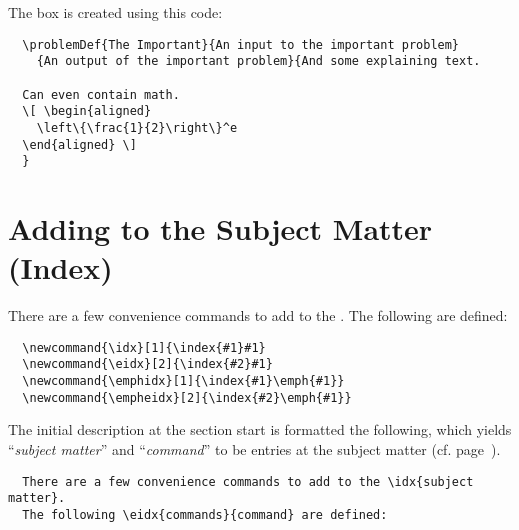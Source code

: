 The box is created using this code:

\begin{lstlisting}
  \problemDef{The Important}{An input to the important problem}
    {An output of the important problem}{And some explaining text.

  Can even contain math.
  \[ \begin{aligned}
    \left\{\frac{1}{2}\right\}^e
  \end{aligned} \]
  }
\end{lstlisting}



\section{Adding to the Subject Matter (Index)}\label{sec:index}

There are a few convenience commands to add to the . The following  are defined:

\begin{lstlisting}
  \newcommand{\idx}[1]{\index{#1}#1}
  \newcommand{\eidx}[2]{\index{#2}#1}
  \newcommand{\emphidx}[1]{\index{#1}\emph{#1}}
  \newcommand{\empheidx}[2]{\index{#2}\emph{#1}}
\end{lstlisting}

The initial description at the section start is formatted the following, which yields ``\emph{subject matter}'' and ``\emph{command}'' to be entries at the subject matter (cf. page~\pageref{lbl:index}).

\begin{lstlisting}
  There are a few convenience commands to add to the \idx{subject matter}.
  The following \eidx{commands}{command} are defined:
\end{lstlisting}
